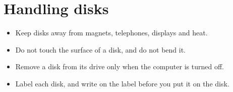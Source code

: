\section{Handling disks}
\begin{itemize}
\item Keep disks away from magnets, telephones, displays and heat.
\item Do not touch the surface of a disk, and do not bend it.
\item Remove a disk from its drive only when the computer is turned off.
\item Label each disk, and write on the label before you put it on the
  disk.
\end{itemize}

